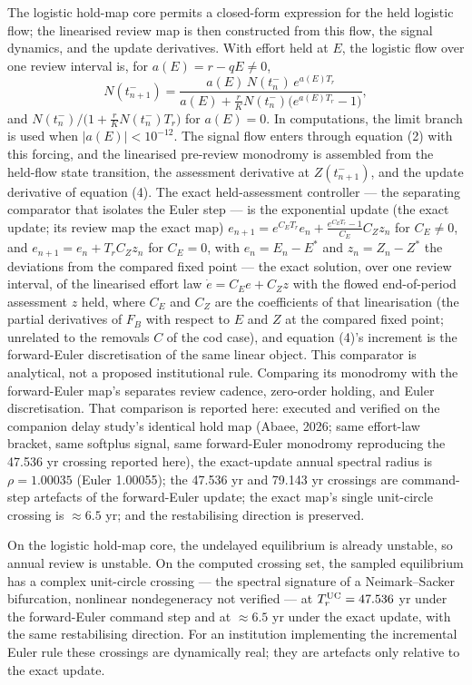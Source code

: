 \documentclass[11pt]{article}
\begin{document}
The logistic hold-map core permits a closed-form expression for the held logistic flow; the linearised review map is then constructed from this flow, the signal dynamics, and the update derivatives. With effort held at \(E\), the logistic flow over one
review interval is, for \(a(E) = r - qE \ne 0\),
\[N(t_{n+1}^-) = \frac{a(E)\,N(t_n^-)\,e^{a(E)T_r}}{a(E) + \tfrac{r}{K}N(t_n^-)\bigl(e^{a(E)T_r} - 1\bigr)},\]
and \(N(t_n^-)\big/\!\bigl(1 + \tfrac{r}{K}N(t_n^-)T_r\bigr)\) for
\(a(E) = 0\). In computations, the limit branch is used when \(|a(E)| < 10^{-12}\). The signal flow enters through equation (2) with this
forcing, and the linearised pre-review monodromy is assembled from the
held-flow state transition, the assessment derivative at
\(Z(t_{n+1}^-)\), and the update derivative of equation (4). The exact
held-assessment controller --- the separating comparator that isolates
the Euler step --- is the exponential update (the exact update; its review map the exact map) \(e_{n+1} = e^{C_E T_r}e_n + \tfrac{e^{C_E T_r}-1}{C_E}C_Z z_n\) for
\(C_E \ne 0\), and \(e_{n+1} = e_n + T_r C_Z z_n\) for \(C_E = 0\), with
\(e_n = E_n - E^*\) and \(z_n = Z_n - Z^*\) the deviations from the compared fixed point --- the exact solution, over one review interval, of the
linearised effort law \(\dot e = C_E e + C_Z z\) with the flowed end-of-period assessment
\(z\) held, where \(C_E\) and \(C_Z\) are the coefficients of that
linearisation (the partial derivatives of \(F_B\) with respect to \(E\)
and \(Z\) at the compared fixed point; unrelated to the removals \(C\)
of the cod case), and equation (4)'s increment is the forward-Euler
discretisation of the same linear object. This comparator is analytical, not a proposed institutional rule. Comparing its monodromy with
the forward-Euler map's separates review cadence, zero-order holding,
and Euler discretisation. That comparison is reported here: executed and
verified on the companion delay study's identical hold map (Abaee, 2026; same effort-law bracket, same softplus signal, same
forward-Euler monodromy reproducing the 47.536 yr crossing reported
here), the exact-update annual spectral radius is \(\rho = 1.00035\)
(Euler 1.00055); the 47.536 yr and 79.143 yr crossings are command-step artefacts of the forward-Euler update;
the exact map's single unit-circle crossing is
\(\approx 6.5\) yr; and the restabilising direction is preserved.

On the logistic hold-map core, the undelayed equilibrium is already
unstable, so annual review is unstable. On the computed crossing set,
the sampled equilibrium has a complex unit-circle crossing --- the
spectral signature of a Neimark--Sacker bifurcation, nonlinear
nondegeneracy not verified --- at \(T_r^{\rm UC}=47.536\) yr under the
forward-Euler command step and at \(\approx 6.5\) yr under the exact update, with the same restabilising direction. For an institution implementing the incremental Euler rule these crossings are dynamically real; they are artefacts only relative to the exact update.
\end{document}
